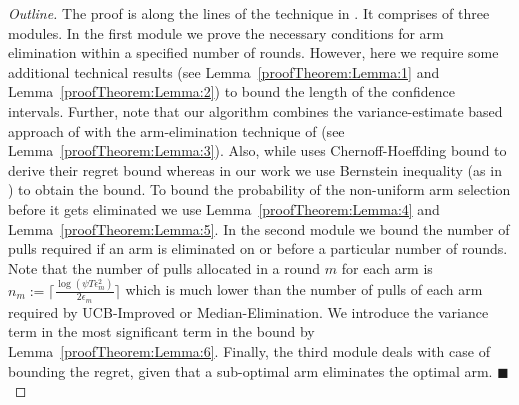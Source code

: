 \begin{proof}[Outline]
The proof is along the lines of the technique in \citet{auer2010ucb}. It comprises of three modules. In the first module we prove the necessary conditions for arm elimination within a specified number of rounds. However, here we require some additional technical results (see Lemma~\ref{proofTheorem:Lemma:1} and Lemma~\ref{proofTheorem:Lemma:2}) to bound the length of the confidence intervals. Further, note that our algorithm combines the variance-estimate based approach of \citet{audibert2009exploration} with the arm-elimination technique of \citet{auer2010ucb} (see Lemma~\ref{proofTheorem:Lemma:3}). Also, while \citet{auer2010ucb} uses Chernoff-Hoeffding bound to derive their regret bound whereas in our work we use  Bernstein inequality (as in \citet{audibert2009exploration}) to obtain the bound. To bound the probability of the non-uniform arm selection before it gets eliminated we use Lemma~\ref{proofTheorem:Lemma:4} and Lemma~\ref{proofTheorem:Lemma:5}. In the second module we bound the number of pulls required if an arm is eliminated on or before a particular number of rounds. Note that the number of pulls allocated in a round $m$ for each arm is $n_{m}:=\bigg\lceil\frac{\log{(\psi T\epsilon_{m}^{2})}}{2\epsilon_{m}}\bigg\rceil$ which is much lower than the number of pulls of each arm required by UCB-Improved or Median-Elimination. We introduce the variance term in the most significant term in the bound by Lemma~\ref{proofTheorem:Lemma:6}. Finally, the third module deals with case of bounding the regret, given that a sub-optimal arm eliminates the optimal arm.
\hfill $\blacksquare$
\end{proof}

